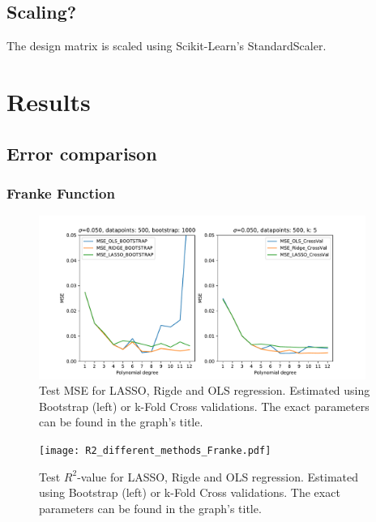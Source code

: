 \documentclass[11pt,a4paper]{article}
\begin{document}
\subsection{Scaling?}
The design matrix is scaled using Scikit-Learn's StandardScaler.
\section{Results}
\subsection{Error comparison}
\subsubsection{Franke Function}
\begin{figure}[H]
\centering
\includegraphics[width=0.95\textwidth]{MSE_different_methods_Franke.pdf}
\caption[Test MSE for LASSO, Rigde and OLS regression]{Test MSE for LASSO, Rigde and OLS regression. Estimated using Bootstrap (left) or k-Fold Cross validations. The exact parameters can be found in the graph's title.}
\label{fig:LASSO_Bias_Variance}
\end{figure}
\begin{figure}[H]
\centering
\texttt{[image: R2\_different\_methods\_Franke.pdf]}
\caption[Test $R^2$-value for LASSO, Rigde and OLS regression]{Test $R^2$-value for LASSO, Rigde and OLS regression. Estimated using Bootstrap (left) or k-Fold Cross validations. The exact parameters can be found in the graph's title.}
\label{fig:LASSO_Bias_Variance}
\end{figure}
\end{document}
